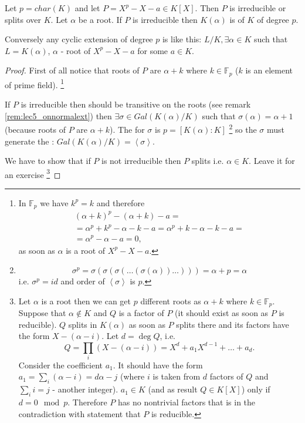 \begin{theorem}
  \label{thm:lec7_1}
  Let $p = char(K)$ and let
  $P = X^p - X - a \in K\left[X\right]$. Then $P$ is irreducible or
  splits over $K$. Let $\alpha$ be a root. If $P$ is irreducible then
  $K\left(\alpha\right)$ is  of $K$ of
  degree $p$.

  Conversely any cyclic extension of degree $p$ is like this: $L/K,
  \exists \alpha \in K$ such that $L = K\left(\alpha\right)$, $\alpha$
  - root of $X^p - X - a$ for some $a \in K$.
  \begin{proof}
    First of all notice that roots of $P$ are $\alpha + k$ where $k
    \in \mathbb{F}_p$ ($k$ is an element of prime field).
    \footnote{
      In $\mathbb{F}_p$ we have $k^p = k$ and therefore 
      \begin{eqnarray}
        \left(\alpha + k\right)^p -
        \left(\alpha + k\right) -a =
        \nonumber \\
        =\alpha^p + k^p - \alpha -k - a =
        \alpha^p + k - \alpha -k - a =
        \nonumber \\
        =
        \alpha^p - \alpha - a =0,
        \nonumber
      \end{eqnarray}
      as soon as $\alpha$ is a root of $X^p - X - a$.
    }

    If $P$ is irreducible then  should be
    transitive
    on the roots (see remark \ref{rem:lec5_onnormalext})  then
    $\exists \sigma \in Gal\left(K\left(\alpha\right)/K\right)$ such that
    $\sigma\left(\alpha\right) = \alpha + 1$ (because roots of $P$ are
    $\alpha + k$). The  for $\sigma$ is
    $p = \left[K\left(\alpha\right):K\right]$
    \footnote{
      \[
      \sigma^p = \sigma(\sigma(\sigma( \dots ( \sigma(\alpha) ) \dots
      ))) = \alpha + p = \alpha
      \]
      i.e. $\sigma^p = id$ and order of $\left<\sigma\right>$ is $p$.
    }
    so the $\sigma$ must
    generate the :
    $Gal\left(K\left(\alpha\right)/K\right) = \left<\sigma\right>$.

    We have to show that if $P$ is not irreducible then $P$ splits
    i.e. $\alpha \in K$. Leave it for an exercise
    \footnote{
      Let $\alpha$ is a root then we can get $p$ different roots as
      $\alpha + k$ where $k \in \mathbb{F}_p$. Suppose that $\alpha
      \notin K$ and $Q$ is a
      factor of $P$ (it should exist as soon as $P$ is reducible). $Q$
      splits in $K\left(\alpha\right)$ as soon as $P$ splits there and
      its factors have the form $X - \left(\alpha - i\right)$.
      Let $d = \deg Q$, i.e.
      \[
      Q = \prod_{i}\left(X - \left(\alpha - i\right)\right) = X^d +
      a_1 X^{d-1} + \dots + a_d.
      \]
      Consider the coefficient $a_1$. It should have the form
      $a_1 = \sum_{i} \left(\alpha - i\right) = d \alpha -j$ (where
      $i$ is taken 
      from $d$ factors of $Q$ and $\sum_{i} i = j$ - another
      integer). $a_1 \in K$ (and as result $Q \in K\left[X\right]$)
      only if $d = 0 \mod p$. Therefore $P$ has no nontrivial
      factors that is in the contradiction with statement that $P$ is
      reducible.

}
\end{proof}
\end{theorem}
